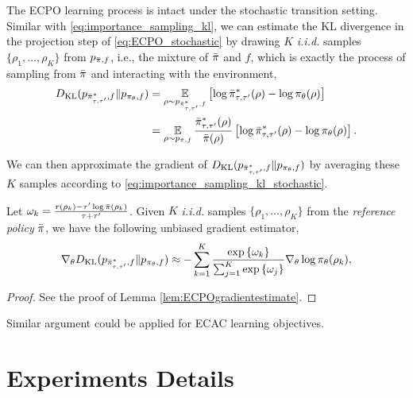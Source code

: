 The ECPO learning process is intact under the stochastic transition setting. Similar with \cref{eq:importance_sampling_kl}, we can estimate the KL divergence in the projection step of \cref{eq:ECPO_stochastic} by drawing $K$ \textit{i.i.d.} samples $\{\rho_1, \dots, \rho_K\}$ from $p_{\bar{\pi}, f}$, i.e., the mixture of $\bar{\pi}$ and $f$, which is exactly the process of sampling from $\bar{\pi}$ and interacting with the environment,
\begin{equation}
\label{eq:importance_sampling_kl_stochastic}
\begin{split}
	D_{\mathrm{KL}}(p_{\bar{\pi}_{\tau,\tau^{\prime}}^*, f}  \| p_{\pi_\theta, f} ) &= \operatorname*{\mathbb{E}}_{\rho \sim p_{\bar{\pi}_{\tau,\tau^{\prime}}^*, f} } \left[ \log \bar{\pi}_{\tau,\tau^{\prime}}^*(\rho) - \log \pi_\theta(\rho) \right] \\
	&= \operatorname*{\mathbb{E}}_{\rho\sim p_{\bar{\pi}, f}} \frac{\bar{\pi}_{\tau,\tau^{\prime}}^*(\rho)}{\bar{\pi}(\rho)} \left[ \log \bar{\pi}_{\tau,\tau^{\prime}}^*(\rho) - \log \pi_\theta(\rho) \right].
\end{split}
\end{equation}

We can then approximate the gradient of $D_{\mathrm{KL}}(p_{\bar{\pi}_{\tau,\tau^{\prime}}^*, f}  \| p_{\pi_\theta, f} )$ by averaging these $K$ samples according to \cref{eq:importance_sampling_kl_stochastic}. 

\begin{thm}
\label{thm:ECPOgradientestimate_stochastic}
Let $\omega_k = \frac{r(\rho_k) - \tau^{\prime} \log{\bar{\pi}(\rho_k)} }{\tau + \tau^{\prime}}$. Given $K$ \emph{i.i.d.} samples $\{\rho_1, \dots, \rho_K\}$ from the \emph{reference policy} $\bar{\pi}$, we have the following unbiased gradient estimator,
\begin{equation}
	\nabla_{\theta} D_{\mathrm{KL}}(p_{\bar{\pi}_{\tau,\tau^{\prime}}^*, f}  \| p_{\pi_\theta, f} ) \approx -\sum\limits_{k=1}^K{ \frac{ \exp\left\{ \omega_k \right\} }{ \sum_{j=1}^K{ \exp\left\{ \omega_j \right\}}} \nabla_{\theta} \log{\pi_\theta(\rho_k)} },
\end{equation}
\end{thm}
\begin{proof}
See the proof of Lemma \ref{lem:ECPOgradientestimate}.
\end{proof}

Similar argument could be applied for ECAC learning objectives. 

\section{Experiments Details}
\label{appendix-experiments}

